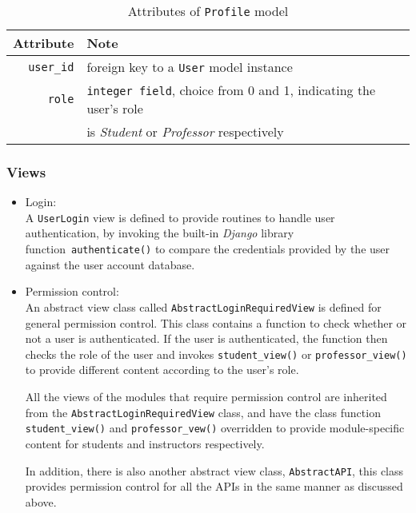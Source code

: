 \begin{table}[ht]
    \centering
    \caption{Attributes of \texttt{Profile} model}
    \label{tab:PROFILE_ATTR}
    \renewcommand{\arraystretch}{1.3}
    \begin{tabular}[ht]{r|l}
        \hline
        Attribute & Note \\
        \hline
        \hline
        \texttt{user\_id} & foreign key to a \texttt{User} model instance \\
        \hline
        \texttt{role} & \texttt{integer field}, choice from 0 and 1, indicating the
            user's role \\
           & is \emph{Student} or \emph{Professor} respectively \\
        \hline
    \end{tabular}
    \renewcommand{\arraystretch}{1}
\end{table}


\subsubsection{Views}

\begin{itemize}
    \item Login: \\
        A \texttt{UserLogin} view is defined to provide routines to handle user
        authentication, by invoking the built-in \emph{Django} library
        function~\texttt{authenticate()}
        to compare the credentials provided
        by the user against the user account database.

    \item Permission control: \\
        An abstract view class called \texttt{AbstractLoginRequiredView} is
        defined for general permission control. This class contains a function
        to check whether or not a user is authenticated. If the user is
        authenticated, the function then checks the role of the user and
        invokes \texttt{student\_view()} or \texttt{professor\_view()} to
        provide different content according to the user's role.

        All the views of the modules that require permission control are
        inherited from the \texttt{AbstractLoginRequiredView} class, and have
        the class function \texttt{student\_\-view()} and
        \texttt{professor\_vew()} overridden to provide module-specific
        content for students and instructors respectively.

        In addition, there is also another abstract view class,
        \texttt{AbstractAPI}, this class provides permission
        control for all the APIs in the same manner as discussed above.
\end{itemize}

